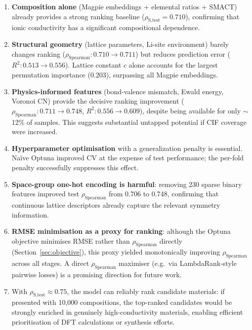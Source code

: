 \documentclass[11pt,a4paper]{article}
\newcommand{\Rtwo}{R^{2}}
\newcommand{\rhoS}{\rho_{\text{Spearman}}}
\begin{document}
\begin{enumerate}[leftmargin=*]
      \item \textbf{Composition alone} (Magpie embeddings + elemental ratios +
            SMACT) already provides a strong ranking baseline ($\rho_{\text{S,test}}
                  = 0.710$), confirming that ionic conductivity has a significant
            compositional dependence.

      \item \textbf{Structural geometry} (lattice parameters, Li-site
            environment) barely changes ranking ($\rhoS: 0.710 \to 0.711$) but
            reduces prediction error ($\Rtwo: 0.513 \to 0.556$).  Lattice
            constant $c$ alone accounts for the largest permutation importance
            (0.203), surpassing all Magpie embeddings.

      \item \textbf{Physics-informed features} (bond-valence mismatch, Ewald
            energy, Voronoi CN) provide the decisive ranking improvement
            ($\rhoS: 0.711 \to 0.748$, $\Rtwo: 0.556 \to 0.609$), despite
            being available for only $\sim$12\% of samples.  This suggests
            substantial untapped potential if CIF coverage were increased.

      \item \textbf{Hyperparameter optimisation} with a generalization penalty
            is essential.  Na\"ive Optuna improved CV at the expense of test
            performance; the per-fold penalty successfully suppresses this
            effect.

      \item \textbf{Space-group one-hot encoding is harmful}: removing 230
            sparse binary features improved test $\rhoS$ from 0.706 to 0.748,
            confirming that continuous lattice descriptors already capture the
            relevant symmetry information.

      \item \textbf{RMSE minimisation as a proxy for ranking}: although the
            Optuna objective minimises RMSE rather than $\rhoS$ directly
            (Section~\ref{sec:objective}), this proxy yielded monotonically
            improving $\rhoS$ across all stages.  A direct $\rhoS$ maximiser
            (e.g.\ via LambdaRank-style pairwise losses) is a promising
            direction for future work.

      \item With $\rho_{\text{S,test}} \approx 0.75$, the model can reliably
            rank candidate materials: if presented with 10{,}000 compositions,
            the top-ranked candidates would be strongly enriched in genuinely
            high-conductivity materials, enabling efficient prioritisation of
            DFT calculations or synthesis efforts.
\end{enumerate}
\end{document}
